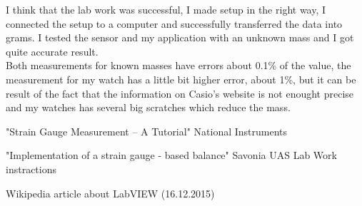 \documentclass[english]{article}
\begin{document}
I think that the lab work was successful, I made setup in the right way, I connected the setup to a computer and successfully transferred the data into grams. I tested the sensor and my application with an unknown mass and I got quite accurate result.\\

Both measurements for known masses have errors about 0.1\% of the value, the measurement for my watch has a little bit higher error, about 1\%, but it can be result of the fact that the information on Casio's website is not enought  precise and my watches has several big scratches which reduce the mass.

\begin{thebibliography}{1}

    "Strain Gauge Measurement – A Tutorial" National Instruments
   
    "Implementation of a strain gauge - based balance" Savonia UAS Lab Work instractions
   
    Wikipedia article about LabVIEW (16.12.2015)
  
  

\end{thebibliography}
\end{document}
